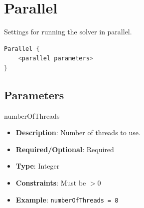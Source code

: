 \section{Parallel}

Settings for running the solver in parallel.

\begin{lstlisting}[language=C++]
Parallel {
    <parallel parameters>
}
\end{lstlisting}

\subsection*{Parameters}

numberOfThreads
\vspace{\the\parameterListSpacing}
\begin{itemize}
    \item {\bf Description}: Number of threads to use.
    \item {\bf Required/Optional}: Required
    \item {\bf Type}: Integer
    \item {\bf Constraints}: Must be $> 0$
    \item {\bf Example}: \lstinline!numberOfThreads = 8!
\end{itemize}
